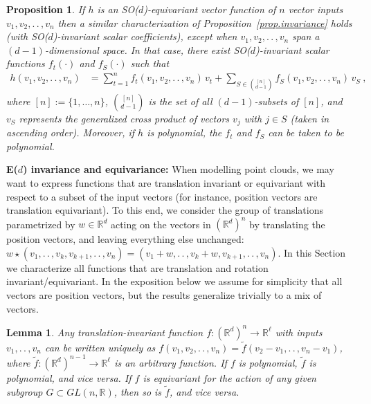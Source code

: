 \documentclass{article}
\renewcommand{\paragraph}[1]{\par\textbf{#1}}
\theoremstyle{Hogg}
\newtheorem{lemma}[theorem]{Lemma}
\newtheorem{proposition}[theorem]{Proposition}
\renewcommand{\ldots}{.\,.\,}
\renewcommand{\cdots}{\ldots}
\begin{document}
\begin{proposition} \label{prop.sod}
If $h$ is an SO($d$)-equivariant vector function of $n$ vector inputs $v_1, v_2, \cdots, v_n$ then a similar characterization of Proposition~\ref{prop.invariance} holds (with SO($d$)-invariant scalar coefficients), except when $v_1,v_2,\ldots,v_n$ span a $(d-1)$-dimensional space. In that case, %
there exist SO($d$)-invariant scalar functions $f_t(\cdot)$ and $f_S(\cdot)$ such that
\begin{align}
    h(v_1, v_2, \cdots, v_n) &=  \textstyle\sum_{t=1}^{n} f_t(v_1, v_2, \cdots, v_n)\,v_t + \sum_{S\in \binom{[n]}{d-1}}f_{S}(v_1, v_2, \cdots, v_n)\,v_S
    ~, 
\end{align}
where $[n]:=\{1,\dots, n\}$, $\binom{[n]}{d-1}$ is the set of all $(d-1)$-subsets of $[n]$, and $v_S$ represents the generalized cross product of vectors $v_j$ with $j\in S$ (taken in ascending order). 
Moreover, if $h$ is polynomial, the $f_t$ and $f_S$ can be taken to be polynomial.
\end{proposition}

\paragraph{E($d$) invariance and equivariance:}
When modelling point clouds, we may want to express functions that are translation invariant or equivariant with respect to a subset of the input vectors (for instance, position vectors are translation equivariant).
To this end, we consider the group of translations parametrized by $w\in \mathbb R^d$ acting on the vectors in $(\mathbb R^d)^n$ by translating the position vectors, and leaving everything else unchanged: $w\star(v_1,\ldots, v_k, v_{k+1},\ldots, v_n)= (v_1+w, \ldots, v_k+w, v_{k+1}, \ldots, v_n)$.
In this Section we characterize all functions that are translation and rotation invariant/equivariant. 
In the exposition below we assume for simplicity that all vectors are position vectors, but the results generalize trivially to a mix of vectors.

\begin{lemma} \label{lemma.translation.invariance}
Any translation-invariant function $f:(\mathbb R^d)^n \to \mathbb R^\ell$ with inputs $v_1,\ldots,v_n$ can be written uniquely as
$f(v_1,v_2,\ldots, v_n)=\tilde f(v_2-v_1, \ldots, v_n-v_1)$, where $\tilde f:(\mathbb R^d)^{n-1} \to \mathbb R^\ell$ is an arbitrary function. If $f$ is polynomial, $\tilde f$ is polynomial, and vice versa. If $f$ is equivariant for the action of any given subgroup $G\subset GL(n,\mathbb R)$, then so is $\tilde f$, and vice versa.
\end{lemma}
\end{document}
